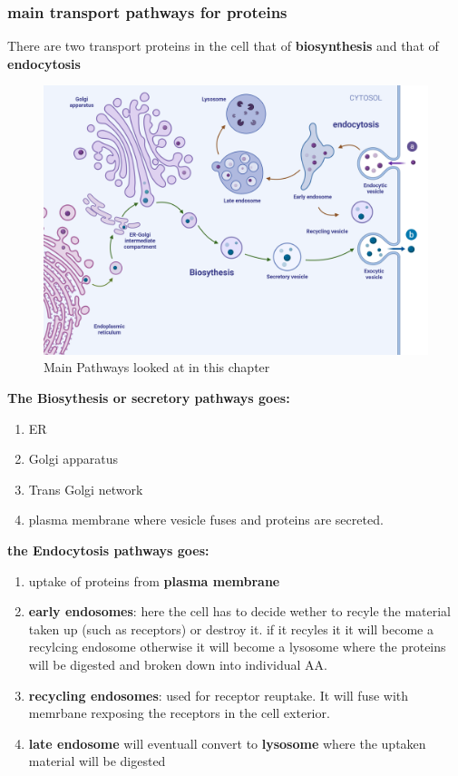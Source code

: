 \documentclass[../main.tex]{subfiles}
\begin{document}
\subsubsection{main transport pathways for proteins}
There are two transport proteins in the cell that of \textbf{biosynthesis} and that of \textbf{endocytosis}
\begin{figure}[H]
    \centering
    \includegraphics[width=0.7\linewidth]{Pathways (1).png}
    \caption{Main Pathways looked at in this chapter}
    \label{fig:enter-label}
\end{figure}
\textbf{The Biosythesis or secretory pathways goes:}
\begin{enumerate}
    \item ER
    \item Golgi apparatus
    \item Trans Golgi network
    \item plasma membrane where vesicle fuses and proteins are secreted.
\end{enumerate}

\textbf{the Endocytosis pathways goes:}
\begin{enumerate}
    \item uptake of proteins from \textbf{plasma membrane}
    \item \textbf{early endosomes}: here the cell has to decide wether to recyle the material taken up (such as receptors) or destroy it. if it recyles it it will become a recylcing endosome otherwise it will become a lysosome where the proteins will be digested and broken down into individual AA.
    \item  \textbf{recycling endosomes}: used for receptor reuptake. It will fuse with memrbane rexposing the receptors in the cell exterior.

    \item \textbf{late endosome} will eventuall convert to \textbf{lysosome } where the uptaken material will be digested
\end{enumerate}
\end{document}
